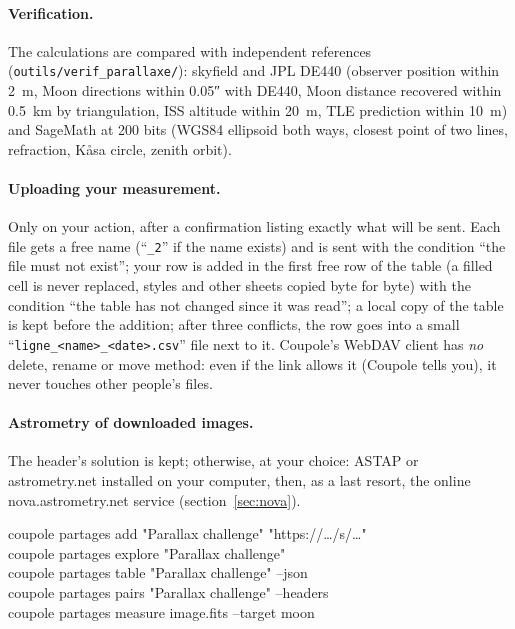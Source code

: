 \paragraph{Verification.} The calculations are compared with independent references (\texttt{outils/verif\_parallaxe/}):
skyfield and JPL DE440 (observer position within 2~m, Moon directions within 0.05″ with DE440, Moon distance
recovered within 0.5~km by triangulation, ISS altitude within 20~m, TLE prediction within 10~m) and SageMath at
200 bits (WGS84 ellipsoid both ways, closest point of two lines, refraction, Kåsa circle, zenith orbit).

\paragraph{Uploading your measurement.} Only on your action, after a confirmation listing exactly what will be sent.
Each file gets a free name (“\texttt{\_2}” if the name exists) and is sent with the condition “the file must not
exist”; your row is added in the first free row of the table (a filled cell is never replaced, styles and other
sheets copied byte for byte) with the condition “the table has not changed since it was read”; a local copy of the
table is kept before the addition; after three conflicts, the row goes into a small
“\texttt{ligne\_<name>\_<date>.csv}” file next to it. Coupole's WebDAV client has \emph{no} delete, rename or move
method: even if the link allows it (Coupole tells you), it never touches other people's files.

\paragraph{Astrometry of downloaded images.} The header's solution is kept; otherwise, at your choice: ASTAP or
astrometry.net installed on your computer, then, as a last resort, the online nova.astrometry.net service
(section~\ref{sec:nova}).

\begin{ccode}
coupole partages add "Parallax challenge" "https://…/s/…"\\
coupole partages explore "Parallax challenge"\\
coupole partages table "Parallax challenge" --json\\
coupole partages pairs "Parallax challenge" --headers\\
coupole partages measure image.fits --target moon
\end{ccode}

